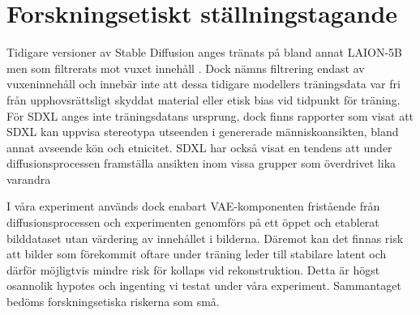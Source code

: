 \section*{Forskningsetiskt ställningstagande}

Tidigare versioner av Stable Diffusion anges tränats på bland annat LAION-5B men som filtrerats mot vuxet innehåll \cite{stabilityai2022sd2}. Dock nämns filtrering endast av vuxeninnehåll och innebär inte att dessa tidigare modellers träningsdata var fri från upphovsrättsligt skyddat material eller etisk bias vid tidpunkt för träning. För SDXL anges inte träningsdatans ursprung, dock finns rapporter som visat att SDXL kan uppvisa stereotypa utseenden i genererade människoansikten, bland annat avseende kön och etnicitet. SDXL har också visat en tendens att under diffusionsprocessen framställa ansikten inom vissa grupper som överdrivet lika varandra \cite{aldahoul2025aigenerated}

I våra experiment används dock enabart VAE-komponenten fristående från diffusionsprocessen och experimenten genomförs på ett öppet och etablerat bilddataset utan värdering av innehållet i bilderna. Däremot kan det finnas risk att bilder som förekommit oftare under träning leder till stabilare latent och därför möjligtvis mindre risk för kollaps vid rekonstruktion. Detta är högst osannolik hypotes och ingenting vi testat under våra experiment. Sammantaget bedöms forskningsetiska riskerna som små.


